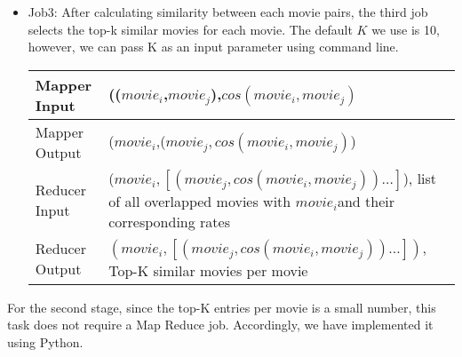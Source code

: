 \begin{itemize}
\item Job3: After calculating similarity between each movie pairs, the
  third job selects the top-k similar movies for each movie. The
  default $K$ we use is 10, however, we can pass K as an input
  parameter using command line.

  \begin{tabular}{|l|p{10cm}|}
    \hline
    Mapper Input & (($movie_i$,$movie_j$),$cos(movie_i,movie_j)$\\
    \hline
    Mapper Output & ($movie_i$,($movie_j,cos(movie_i,movie_j)$)\\
    \hline
    Reducer Input & ($movie_i,[(movie_j,cos(movie_i,movie_j))\ldots]$), list of all overlapped movies with $movie_i$and their corresponding rates\\
    \hline
    Reducer Output & $(movie_i,[(movie_j,cos(movie_i,movie_j))\ldots])$, Top-K similar movies per movie \\
    \hline
  \end{tabular}
\end{itemize}

For the second stage, since the top-K entries per movie is a small
number, this task does not require a Map Reduce job. Accordingly, we
have implemented it using Python.
